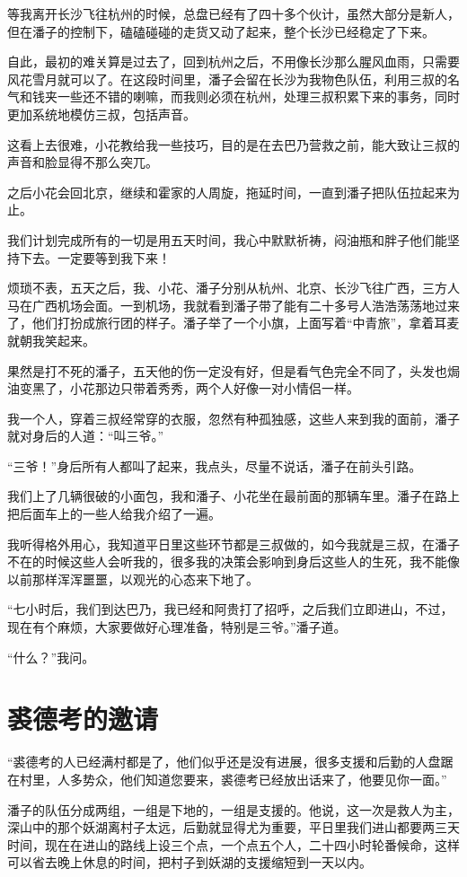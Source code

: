 等我离开长沙飞往杭州的时候，总盘已经有了四十多个伙计，虽然大部分是新人，但在潘子的控制下，磕磕碰碰的走货又动了起来，整个长沙已经稳定了下来。

自此，最初的难关算是过去了，回到杭州之后，不用像长沙那么腥风血雨，只需要风花雪月就可以了。在这段时间里，潘子会留在长沙为我物色队伍，利用三叔的名气和钱夹一些还不错的喇嘛，而我则必须在杭州，处理三叔积累下来的事务，同时更加系统地模仿三叔，包括声音。

这看上去很难，小花教给我一些技巧，目的是在去巴乃营救之前，能大致让三叔的声音和脸显得不那么突兀。

之后小花会回北京，继续和霍家的人周旋，拖延时间，一直到潘子把队伍拉起来为止。

我们计划完成所有的一切是用五天时间，我心中默默祈祷，闷油瓶和胖子他们能坚持下去。一定要等到我下来！

烦琐不表，五天之后，我、小花、潘子分别从杭州、北京、长沙飞往广西，三方人马在广西机场会面。一到机场，我就看到潘子带了能有二十多号人浩浩荡荡地过来了，他们打扮成旅行团的样子。潘子举了一个小旗，上面写着“中青旅”，拿着耳麦就朝我笑起来。

果然是打不死的潘子，五天他的伤一定没有好，但是看气色完全不同了，头发也焗油变黑了，小花那边只带着秀秀，两个人好像一对小情侣一样。

我一个人，穿着三叔经常穿的衣服，忽然有种孤独感，这些人来到我的面前，潘子就对身后的人道：“叫三爷。”

“三爷！”身后所有人都叫了起来，我点头，尽量不说话，潘子在前头引路。

我们上了几辆很破的小面包，我和潘子、小花坐在最前面的那辆车里。潘子在路上把后面车上的一些人给我介绍了一遍。

我听得格外用心，我知道平日里这些环节都是三叔做的，如今我就是三叔，在潘子不在的时候这些人会听我的，很多我的决策会影响到身后这些人的生死，我不能像以前那样浑浑噩噩，以观光的心态来下地了。

“七小时后，我们到达巴乃，我已经和阿贵打了招呼，之后我们立即进山，不过，现在有个麻烦，大家要做好心理准备，特别是三爷。”潘子道。

“什么？”我问。

\chapter{裘德考的邀请}

“裘德考的人已经满村都是了，他们似乎还是没有进展，很多支援和后勤的人盘踞在村里，人多势众，他们知道您要来，裘德考已经放出话来了，他要见你一面。”

潘子的队伍分成两组，一组是下地的，一组是支援的。他说，这一次是救人为主，深山中的那个妖湖离村子太远，后勤就显得尤为重要，平日里我们进山都要两三天时间，现在在进山的路线上设三个点，一个点五个人，二十四小时轮番候命，这样可以省去晚上休息的时间，把村子到妖湖的支援缩短到一天以内。

